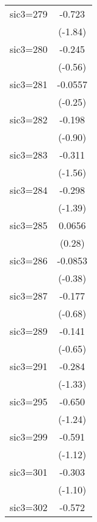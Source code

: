 \begin{table}[htbp]
\begin{tabular*}{0.8\hsize}{@{\hskip\tabcolsep\extracolsep\fill}l*{1}{c}}
\addlinespace
sic3=279            &      -0.723         \\
                    &     (-1.84)         \\
\addlinespace
sic3=280            &      -0.245         \\
                    &     (-0.56)         \\
\addlinespace
sic3=281            &     -0.0557         \\
                    &     (-0.25)         \\
\addlinespace
sic3=282            &      -0.198         \\
                    &     (-0.90)         \\
\addlinespace
sic3=283            &      -0.311         \\
                    &     (-1.56)         \\
\addlinespace
sic3=284            &      -0.298         \\
                    &     (-1.39)         \\
\addlinespace
sic3=285            &      0.0656         \\
                    &      (0.28)         \\
\addlinespace
sic3=286            &     -0.0853         \\
                    &     (-0.38)         \\
\addlinespace
sic3=287            &      -0.177         \\
                    &     (-0.68)         \\
\addlinespace
sic3=289            &      -0.141         \\
                    &     (-0.65)         \\
\addlinespace
sic3=291            &      -0.284         \\
                    &     (-1.33)         \\
\addlinespace
sic3=295            &      -0.650         \\
                    &     (-1.24)         \\
\addlinespace
sic3=299            &      -0.591         \\
                    &     (-1.12)         \\
\addlinespace
sic3=301            &      -0.303         \\
                    &     (-1.10)         \\
\addlinespace
sic3=302            &      -0.572         \\

\end{tabular*}
\end{table}

